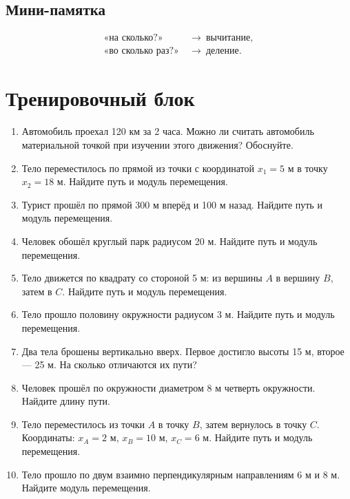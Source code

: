 \documentclass[a4paper,12pt]{article}
\begin{document}
\subsection*{Мини-памятка}

\[
\boxed{
\begin{aligned}
\text{«на сколько?»} &\ \longrightarrow\ \text{вычитание},\\
\text{«во сколько раз?»} &\ \longrightarrow\ \text{деление}.
\end{aligned}
}
\]


\newpage

\section*{Тренировочный блок}

\begin{enumerate}[label=\arabic*.]

\item
Автомобиль проехал 120 км за 2 часа.
Можно ли считать автомобиль материальной точкой
при изучении этого движения?
Обоснуйте.

\item
Тело переместилось по прямой из точки
с координатой $x_1=5$ м в точку $x_2=18$ м.
Найдите путь и модуль перемещения.

\item
Турист прошёл по прямой 300 м вперёд
и 100 м назад.
Найдите путь и модуль перемещения.

\item
Человек обошёл круглый парк радиусом 20 м.
Найдите путь и модуль перемещения.

\item
Тело движется по квадрату со стороной 5 м:
из вершины $A$ в вершину $B$, затем в $C$.
Найдите путь и модуль перемещения.

\item
Тело прошло половину окружности радиусом 3 м.
Найдите путь и модуль перемещения.

\item
Два тела брошены вертикально вверх.
Первое достигло высоты 15 м,
второе --- 25 м.
На сколько отличаются их пути?

\item
Человек прошёл по окружности диаметром 8 м
четверть окружности.
Найдите длину пути.

\item
Тело переместилось из точки $A$ в точку $B$,
затем вернулось в точку $C$.
Координаты:
$x_A=2$ м,
$x_B=10$ м,
$x_C=6$ м.
Найдите путь и модуль перемещения.

\item
Тело прошло по двум взаимно перпендикулярным
направлениям 6 м и 8 м.
Найдите модуль перемещения.

\end{enumerate}
\end{document}
